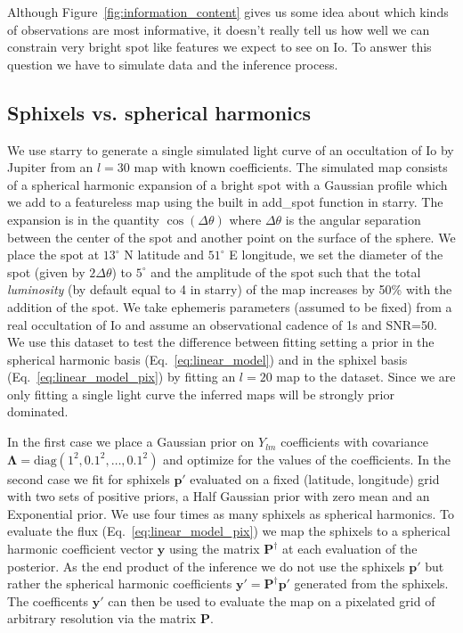 \documentclass[modern]{aastex62}
\begin{document}
Although Figure~\ref{fig:information_content} gives us some idea about which kinds of observations are most informative, it doesn't really tell us how well we can constrain very bright spot like features we expect to see on Io.
To answer this question we have to simulate data and the inference process.

\subsection{Sphixels vs. spherical harmonics}
\label{ssec:sphixels_vs_harmonics}
We use \textsf{starry} to generate a single simulated light curve of an occultation of Io by Jupiter from an $l=30$ map with known coefficients.
The simulated map consists of a spherical harmonic expansion of a bright spot with a Gaussian profile which we add to a featureless map using the built in \textsf{add\_spot} function in \textsf{starry}.
The expansion is in the quantity $\cos(\Delta\theta)$ where $\Delta\theta$ is the angular separation between the center of the spot and another point on the surface of the sphere. 
We place the spot at $13^\circ$ N latitude and $51^\circ$ E longitude, we set the diameter of the spot (given by  $2\Delta\theta$) to $5^\circ$ and the amplitude of the spot such that the total \emph{luminosity} (by default equal to 4 in \textsf{starry}) of the map increases by 50\% with the addition of the spot.
We take ephemeris parameters (assumed to be fixed) from a real occultation of Io and assume an observational cadence of 1s and SNR=50.
We use this dataset to test the difference between fitting setting a prior in the spherical harmonic basis (Eq.~\ref{eq:linear_model}) and in the sphixel basis (Eq.~\ref{eq:linear_model_pix}) by fitting an $l=20$ map to the dataset.
Since we are only fitting a single light curve the inferred maps will be strongly prior dominated.

In the first case we place a Gaussian prior on $Y_{lm}$ coefficients with covariance $\boldsymbol{\Lambda}=\mathrm{diag}(1^2,0.1^2,\dots,0.1^2)$ and optimize for the values of the coefficients.
In the second case we fit for sphixels $\mathbf{p}'$ evaluated on a fixed (latitude, longitude) grid with two sets of positive priors, a Half Gaussian prior with zero mean and an Exponential prior.
We use four times as many sphixels as spherical harmonics.
To evaluate the flux (Eq.~\ref{eq:linear_model_pix}) we map the sphixels to a spherical harmonic coefficient vector $\mathbf{y}$ using the matrix $\mathbf{P}^\dagger$ at each evaluation of the posterior.
As the end product of the inference we do not use the sphixels $\mathbf{p}'$ but rather the spherical harmonic coefficients $\mathbf{y}'=\mathbf{P}^\dagger\mathbf{p}'$ generated from the sphixels.
The coefficents $\mathbf{y}'$ can then be used to evaluate the map on a pixelated grid of arbitrary resolution via the matrix $\mathbf{P}$. 
\end{document}
